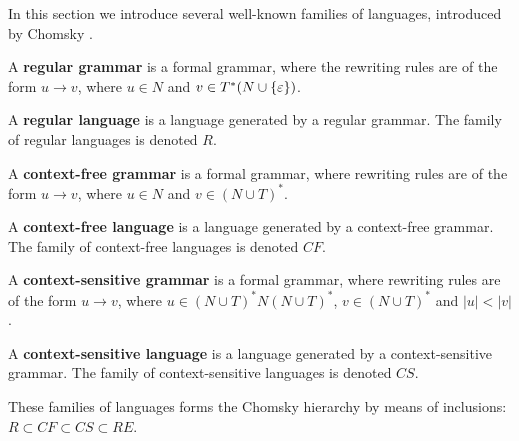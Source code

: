 In this section we introduce several well-known families of languages, introduced by  Chomsky \cite{Chomsky56Hierarchy}.

\begin{definition}
A  {\bf regular grammar} is a formal grammar, where the rewriting rules are of the form $u\rightarrow v$, where $u\in N$ and $v\in T^*(N\cup \{\varepsilon\})$.
\end{definition}

\begin{definition}
A  {\bf regular language} is a language generated by a regular grammar. The family of regular languages is denoted $R$.
\end{definition}

\begin{definition}
A  {\bf context-free grammar} is a formal grammar, where rewriting rules are of the form $u\rightarrow v$, where $u\in N$ and $v\in (N\cup T)^*$.
\end{definition}

\begin{definition}
A  {\bf context-free language} is a language generated by a context-free grammar. The family of context-free languages is denoted $CF$.
\end{definition}

\begin{definition}
A  {\bf context-sensitive grammar} is a formal grammar, where rewriting rules are of the form $u\rightarrow v$, where $u\in (N\cup T)^*N(N\cup T)^*$, $v\in (N\cup T)^*$ and $|u| < |v|$.
\end{definition}

\begin{definition}
A  {\bf context-sensitive language} is a language generated by a context-sensitive grammar. The family of context-sensitive languages is denoted $CS$.
\end{definition}

These families of languages forms the Chomsky hierarchy by means of inclusions: $R \subset CF \subset CS \subset RE$.
